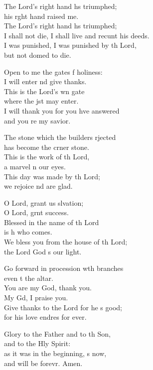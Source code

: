 \begin{psalmverse}
\begin{patverse}
    The Lord’s right hand hs triumphed;\Med\\
    his r\pointup{\i}ght hand raised me.\\
    The Lord’s right hand hs triumphed;\Med\\
    I shall not die, I shall live and recunt his deeds.\\
    I was punished, I was punished by th Lord,\Med\\
    but not domed to die.

    Open to me the gates f holiness:\Med\\
    I will enter nd give thanks.\\
    This is the Lord’s wn gate\Med\\
    where the jst may enter.\\
    I will thank you for you hve answered\Med\\
    and you re my savior.

    The stone which the builders rjected\Med\\
    has become the crner stone.\\
    This is the work of th Lord,\Med\\
    a marvel \pointup{\i}n our eyes.\\
    This day was made by th Lord;\Med\\
    we rejoice nd are glad.

    O Lord, grant us slvation;\Med\\
    O Lord, grnt success.\\
    Blessed in the name of th Lord\Med\\
    is h who comes.\\
    We bless you from the house of th Lord;\Med\\
    the Lord God \pointup{\i}s our light.

    Go forward in procession w\pointup{\i}th branches\Med\\
    even t the altar.\\
    You are my God,  thank you.\Med\\
    My Gd, I praise you.\\
    Give thanks to the Lord for he \pointup{\i}s good;\Med\\
    for his love endres for ever.

    Glory to the Father and to th Son,\Med\\
    and to the Hly Spirit:\\
    as it was in the beginning, \pointup{\i}s now,\Med\\
    and will be forevr. Amen.
  \end{patverse}
\end{psalmverse}
